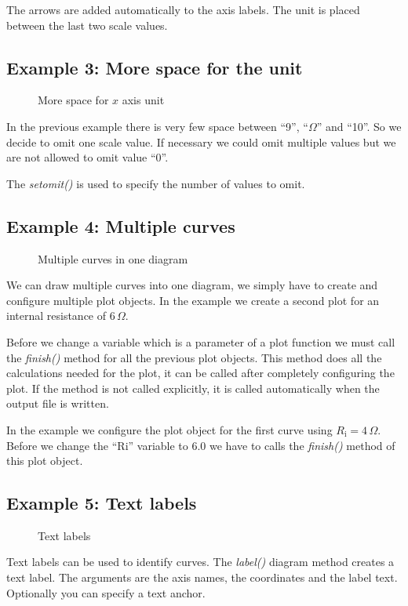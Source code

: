 \documentclass[origlongtable]{scrartcl}
\newcommand{\includepgfimage}[2]{%
\begin{figure}%
{\centering%
\caption{#2}\label{fig:#1}%
}%
\end{figure}%
}
\begin{document}
The arrows are added automatically to the axis labels.
The unit is placed between the last two scale values.
\clearpage
\subsection[Space for unit]{Example 3: More space for the unit}
\includepgfimage{../examples/test003a}{More space for \(x\) axis unit}
In the previous example there is very few space between ``9'', ``\(\Omega\)''
and ``10''. So we decide to omit one scale value. If necessary we could
omit multiple values but we are not allowed to omit value ``0''.

The \textit{set\textunderscore{}omit()\/} is used to specify the number
of values to omit.

\clearpage
\subsection[Multiple curves]{Example 4: Multiple curves}
\includepgfimage{../examples/test004a}{Multiple curves in one diagram}
We can draw multiple curves into one diagram, we simply have to
create and configure multiple plot objects.
In the example we create a second plot for an internal resistance
of \(6\,\Omega\).

Before we change a variable which is a parameter of a plot function
we must call the \textit{finish()\/} method for all the previous
plot objects. This method does all the calculations needed for the
plot, it can be called after completely configuring the plot.
If the method is not called explicitly, it is called automatically
when the output file is written.

In the example we configure the plot object for the first curve
using \(R_{\text{i}}=4\,\Omega\). Before we change the
``\textdollar{}Ri'' variable to 6.0 we have to calls the
\textit{finish()\/} method of this plot object.

\clearpage
\subsection[Text labels]{Example 5: Text labels}
\includepgfimage{../examples/test005a}{Text labels}
Text labels can be used to identify curves. The
\textit{label()\/} diagram method creates a text label.
The arguments are the axis names, the coordinates and the label text.
Optionally you can specify a text anchor.
\end{document}
